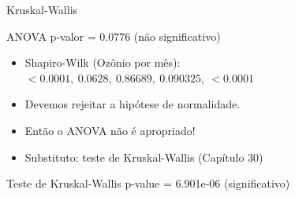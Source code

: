 \documentclass{beamer}
\begin{document}
\begin{frame}{Kruskal-Wallis}
  \begin{exampleblock}{ANOVA}
    p-valor = 0.0776 (não significativo)
  \end{exampleblock}
  \begin{itemize}
  \item Shapiro-Wilk (Ozônio por mês): $< 0.0001,\ 0.0628,\ 0.86689,\ 0.090325,\ < 0.0001$
  \item Devemos rejeitar a hipótese de normalidade.
  \item Então o ANOVA \alert{não é} apropriado!
  \item Substituto: teste de Kruskal-Wallis (Capítulo 30)
  \end{itemize}
  \begin{exampleblock}{Teste de Kruskal-Wallis}
    p-value = \alert{6.901e-06} (significativo)
  \end{exampleblock}
\end{frame}
\end{document}
